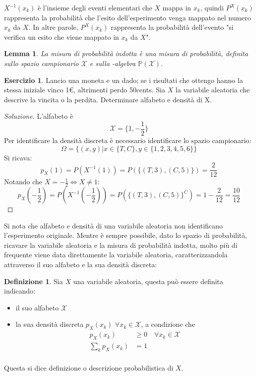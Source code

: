 \documentclass{article}
\theoremstyle{plain}
\newtheorem{lemma}{Lemma}[section]
\theoremstyle{definition}
\newtheorem{definizione}{Definizione}[section]
\newtheorem{esercizio}{Esercizio}[section]
\theoremstyle{remark}
\newenvironment{soluzione}
	{\renewcommand\qedsymbol{$\mathwitch*$}\begin{proof}[Soluzione]}
	{\end{proof}}
\renewcommand{\qedsymbol}{$\mathrightghost$}
\begin{document}
$X^{-1}(x_k)$ è l'insieme degli eventi elementari che $X$ mappa in $x_k$, quindi $P^X(x_k)$ rappresenta la probabilità che l'esito dell'esperimento venga mappato nel numero $x_k$ da $X$. In altre parole, $P^X(x_k)$ rappresenta la probabilità dell'evento "si verifica un esito che viene mappato in $x_k$ da $X$".
\begin{lemma}
	La misura di probabilità indotta è una misura di probabilità, definita sullo spazio campionario $\mathcal{X}$ e sulla \sigma-algebra $\mathds{P}(\mathcal{X})$.
\end{lemma}
\begin{esercizio}
	Lancio una moneta e un dado; se i risultati che ottengo hanno la stessa iniziale vinco 1€, altrimenti perdo 50cents. Sia $X$ la variabile aleatoria che descrive la vincita o la perdita. Determinare alfabeto e densità di X.
	\begin{soluzione}
		L'alfabeto è
		\begin{equation*}
			\mathcal{X}=\{1,-\frac{1}{2}\}
		\end{equation*}
		Per identificare la densità discreta è necessario identificare lo spazio campionario:
		\begin{equation*}
			\Omega=\{(x,y)|x\in\{T,C\}, y\in\{1,2,3,4,5,6\}\}
		\end{equation*}
		Si ricava:
		\begin{equation*}
			p_X(1)=P(X^{-1}(1))=P(\{(T,3),(C,5)\})=\frac{2}{12}
		\end{equation*}
		Notando che $X=-\frac{1}{2}\Leftrightarrow X\neq 1$:
		\begin{equation*}
			p_X(-\frac{1}{2})=P(X^{-1}(-\frac{1}{2}))=P(\{(T,3),(C,5)\}^C)=1-\frac{2}{12}=\frac{10}{12}
		\end{equation*}
	\end{soluzione}
\end{esercizio}
Si nota che alfabeto e densità di una variabile aleatoria non identificano l'esperimento originale. Mentre è sempre possibile, dato lo spazio di probabilità, ricavare la variabile aleatoria e la misura di probabilità indotta, molto più di frequente viene data direttamente la variabile aleatoria, caratterizzandola attraverso il suo alfabeto e la sua densità discreta:
\begin{definizione}
	Sia $X$ una variabile aleatoria, questa può essere definita indicando:
	\begin{itemize}
		\item il suo alfabeto $\mathcal{X}$
		\item la sua densità discreta $p_X(x_k)$ $\forall x_k\in\mathcal{X}$, a condizione che
		\begin{align*}
			p_X(x_k)&\geq0\quad\forall x_k\in\mathcal{X}\\
			\sum_k p_X(x_k)&=1\\
		\end{align*}
	\end{itemize}
	Questa si dice definizione o descrizione probabilistica di $X$.
\end{definizione}
\end{document}

